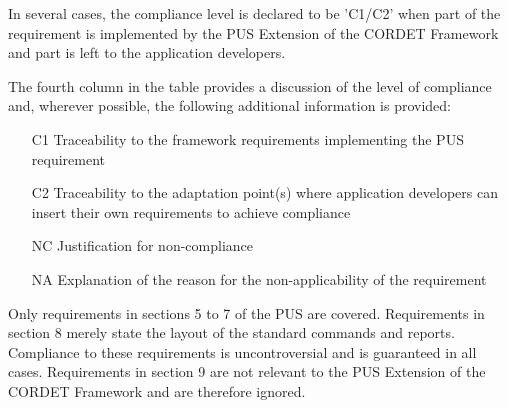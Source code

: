 \documentclass{pnp_article}
\begin{document}
In several cases, the compliance level is declared to be 'C1/C2' when part of the requirement is implemented by the PUS Extension of the CORDET Framework and part is left to the application developers.

The fourth column in the table provides a discussion of the level of compliance and, wherever possible, the following additional information is provided:

\begin{itemize}
\item [C1] Traceability to the framework requirements implementing the PUS requirement 
\item [C2] Traceability to the adaptation point(s) where application developers can insert their own requirements to achieve compliance
\item [NC] Justification for non-compliance
\item [NA] Explanation of the reason for the non-applicability of the requirement
\end{itemize}

Only requirements in sections 5 to 7 of the PUS are covered. Requirements in section 8 merely state the layout of the standard commands and reports. Compliance to these requirements is uncontroversial and is guaranteed in all cases. Requirements in section 9 are not relevant to the PUS Extension of the CORDET Framework and are therefore ignored.

\begin{landscape} 



\end{landscape}
\end{document}
